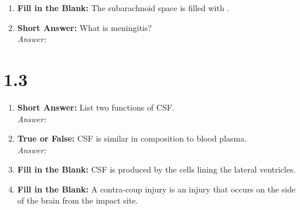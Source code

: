 \begin{enumerate}[label=\textbf{Q1.2.\arabic*}]
      \item \textbf{Fill in the Blank:} The subarachnoid space is filled with \underline{\hspace{3cm}}. \\

      \item \textbf{Short Answer:} What is meningitis? \\
            \textit{Answer:} \\%


\end{enumerate}
\squigglyline
\section*{1.3}
\begin{enumerate}[label=\textbf{Q1.3.\arabic*}]
      \item \textbf{Short Answer:} List two functions of CSF. \\
            \textit{Answer:} \\%

      \item \textbf{True or False:} CSF is similar in composition to blood plasma. \\
            \textit{Answer:} %

      \item \textbf{Fill in the Blank:} CSF is produced by the \underline{\hspace{3cm}} cells lining the lateral ventricles.

      \item \textbf{Fill in the Blank:} A contra-coup injury is an injury that occurs on the \underline{\hspace{3cm}} side of the brain from the impact site.
\end{enumerate}
\squigglyline
